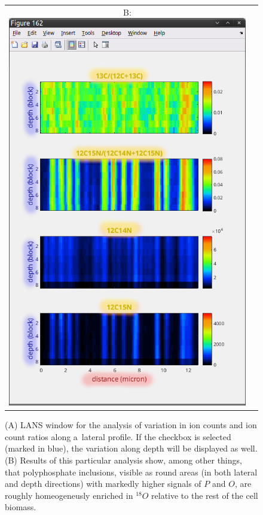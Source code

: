 \begin{figure}[!ht]
\begin{tabular}{cc}
B: \includegraphics[scale=0.33, valign=t]{figs3/LANS-lateral2}
\end{tabular}
\caption{\label{fig:lateral}%
(A) LANS window for the analysis of variation in ion counts and ion count ratios along a~lateral profile. If the  checkbox is selected (marked in blue), the variation along depth will be displayed as well. (B) Results of this particular analysis show, among other things, that polyphosphate inclusions, visible as round areas (in both lateral and depth directions) with markedly higher signals of $P$ and $O$, are roughly homeogeneusly enriched in ${}^{18}O$ relative to the rest of the cell biomass.}
\end{figure}

